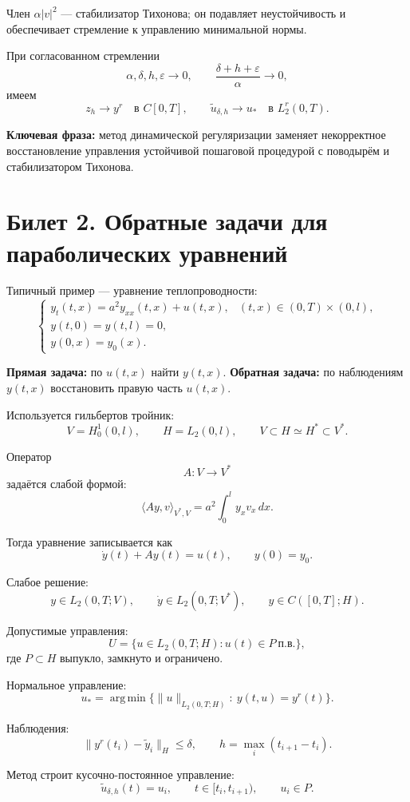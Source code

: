 \documentclass[12pt,a4paper]{article}
\begin{document}
Член \(\alpha|v|^2\) --- стабилизатор Тихонова; он подавляет неустойчивость и обеспечивает стремление к управлению минимальной нормы.

При согласованном стремлении
\[
\alpha,\delta,h,\varepsilon\to0,\qquad
\frac{\delta+h+\varepsilon}{\alpha}\to0,
\]
имеем
\[
z_h\to y^r \quad \text{в } C[0,T],
\qquad
\tilde u_{\delta,h}\to u_* \quad \text{в } L_2^r(0,T).
\]

\textbf{Ключевая фраза:} метод динамической регуляризации заменяет некорректное восстановление управления устойчивой пошаговой процедурой с поводырём и стабилизатором Тихонова.

\section*{Билет 2. Обратные задачи для параболических уравнений}

Типичный пример --- уравнение теплопроводности:
\[
\begin{cases}
y_t(t,x)=a^2y_{xx}(t,x)+u(t,x), &(t,x)\in(0,T)\times(0,l),\\
y(t,0)=y(t,l)=0,\\
y(0,x)=y_0(x).
\end{cases}
\]

\textbf{Прямая задача:} по \(u(t,x)\) найти \(y(t,x)\).  
\textbf{Обратная задача:} по наблюдениям \(y(t,x)\) восстановить правую часть \(u(t,x)\).

Используется гильбертов тройник:
\[
V=H_0^1(0,l),\qquad H=L_2(0,l),\qquad
V\subset H\simeq H^*\subset V^*.
\]

Оператор
\[
A:V\to V^*
\]
задаётся слабой формой:
\[
\langle Ay,v\rangle_{V^*,V}
=
a^2\int_0^l y_xv_x\,dx.
\]

Тогда уравнение записывается как
\[
\dot y(t)+Ay(t)=u(t),\qquad y(0)=y_0.
\]

Слабое решение:
\[
y\in L_2(0,T;V),\qquad \dot y\in L_2(0,T;V^*),
\qquad y\in C([0,T];H).
\]

Допустимые управления:
\[
U=\{u\in L_2(0,T;H):u(t)\in P\ \text{п.в.}\},
\]
где \(P\subset H\) выпукло, замкнуто и ограничено.

Нормальное управление:
\[
u_*=\operatorname*{arg\,min}\{\|u\|_{L_2(0,T;H)}:\ y(t,u)=y^r(t)\}.
\]

Наблюдения:
\[
\|y^r(t_i)-\tilde y_i\|_H\le\delta,\qquad
h=\max_i(t_{i+1}-t_i).
\]

Метод строит кусочно-постоянное управление:
\[
\tilde u_{\delta,h}(t)=u_i,\qquad t\in[t_i,t_{i+1}),\qquad u_i\in P.
\]
\end{document}

